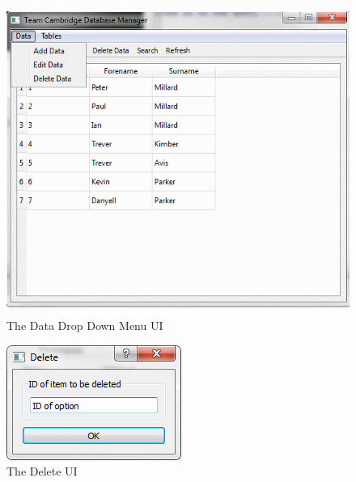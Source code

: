 \begin{figure}
\includegraphics[width=\textwidth]{./Maintenance/UI/DataDrop.png}
\caption{The Data Drop Down Menu UI} \label{fig:DataDrop_UI}
\end{figure}

\begin{figure}
\includegraphics[width=\textwidth]{./Maintenance/UI/Delete.png}
\caption{The Delete UI} \label{fig:Delete_UI}
\end{figure}

